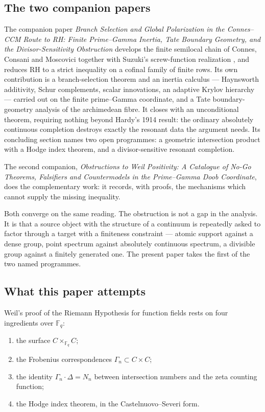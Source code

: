 \documentclass[11pt]{amsart}
\theoremstyle{definition}
\theoremstyle{remark}
\newcommand{\RH}{\mathrm{RH}}
\begin{document}
\subsection{The two companion papers}

The companion paper \emph{Branch Selection and Global Polarization in the
Connes--CCM Route to RH: Finite Prime--Gamma Inertia, Tate Boundary
Geometry, and the Divisor-Sensitivity Obstruction} develops the finite
semilocal chain of Connes, Consani and Moscovici \cite{CCM2025} together
with Suzuki's screw-function realization \cite{Suzuki2025,SuzukiScrew}, and
reduces $\RH$ to a strict inequality on a cofinal family of finite rows.  Its
own contribution is a branch-selection theorem and an inertia calculus ---
Haynsworth additivity, Schur complements, scalar innovations, an adaptive
Krylov hierarchy --- carried out on the finite prime--Gamma coordinate, and
a Tate boundary-geometry analysis of the archimedean fibre.  It closes with
an unconditional theorem, requiring nothing beyond Hardy's 1914 result: the
ordinary absolutely continuous completion destroys exactly the resonant data
the argument needs.  Its concluding section names two open programmes: a
geometric intersection product with a Hodge index theorem, and a
divisor-sensitive resonant completion.

The second companion, \emph{Obstructions to Weil Positivity: A Catalogue of
No-Go Theorems, Falsifiers and Countermodels in the Prime--Gamma Doob
Coordinate}, does the complementary work: it records, with proofs, the
mechanisms which cannot supply the missing inequality.

Both converge on the same reading.  The obstruction is not a gap in the
analysis.  It is that a source object with the structure of a continuum is
repeatedly asked to factor through a target with a finiteness constraint ---
atomic support against a dense group, point spectrum against absolutely
continuous spectrum, a divisible group against a finitely generated one.
The present paper takes the first of the two named programmes.

\subsection{What this paper attempts}

Weil's proof of the Riemann Hypothesis for function fields
\cite{Weil1948,Weil1952} rests on four ingredients over $\mathbb F_q$:

\begin{enumerate}
\item[(a)] the surface $C\times_{\mathbb F_q}C$;
\item[(b)] the Frobenius correspondences $\Gamma_n\subset C\times C$;
\item[(c)] the identity $\Gamma_n\cdot\Delta=N_n$ between intersection
numbers and the zeta counting function;
\item[(d)] the Hodge index theorem, in the Castelnuovo--Severi form.
\end{enumerate}
\end{document}
